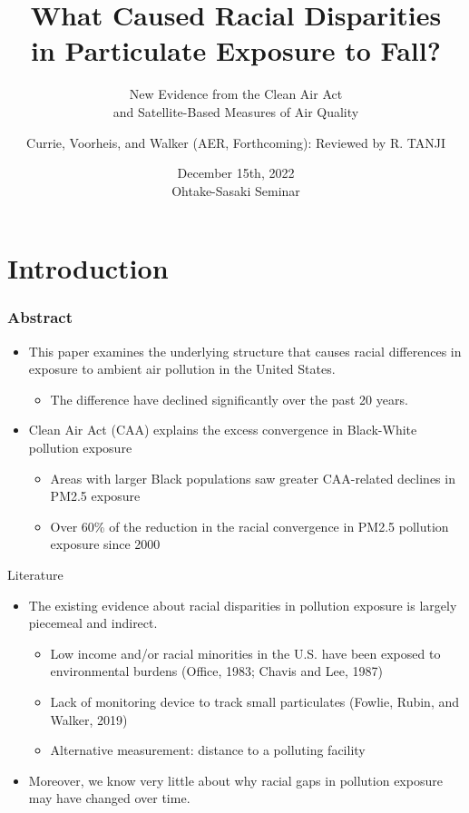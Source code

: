 \documentclass[dvipdfmx,12pt]{beamer}
\title[Currie, Voorheis, and Walker, Forthcoming]{What Caused Racial Disparities \\ in Particulate Exposure to Fall?}
\subtitle{New Evidence from the Clean Air Act \\ and Satellite-Based Measures of Air Quality}
\author[R.Tanji]{Currie, Voorheis, and Walker (AER, Forthcoming): Reviewed by R. TANJI}
\date[12/15/2022 OS Semi.]{December 15th, 2022 \\ Ohtake-Sasaki Seminar}
\institute[]{Osaka University, Graduate School of Economics}
\begin{document}
\begin{frame}\frametitle{}
\titlepage
\end{frame}

\section{Introduction}

\begin{frame}\frametitle{Abstract}
  \begin{itemize}
    \item This paper examines the underlying structure that causes racial differences in exposure to ambient air pollution in the United States.
    \begin{itemize}
      \item The difference have declined significantly over the past 20 years.
    \end{itemize}
    \item Clean Air Act (CAA) explains the excess convergence in Black-White pollution exposure
    \begin{itemize}
      \item Areas with larger Black populations saw greater CAA-related declines in PM2.5 exposure
      \item Over 60\% of the reduction in the racial convergence in PM2.5 pollution exposure since 2000
    \end{itemize}
  \end{itemize}
\end{frame}

\frame{\tableofcontents}

\begin{frame}{Literature}
  \begin{itemize}
    \item The existing evidence about racial disparities in pollution exposure is largely piecemeal and indirect.
    \begin{itemize}
      \item Low income and/or racial minorities in the U.S. have been exposed to environmental burdens (Office, 1983; Chavis and Lee, 1987)
      \item Lack of monitoring device to track small particulates (Fowlie, Rubin, and Walker, 2019)
      \item Alternative measurement: distance to a polluting facility
    \end{itemize}
    \item Moreover, we know very little about why racial gaps in pollution exposure may have changed over time.
  \end{itemize}
\end{frame}
\end{document}
